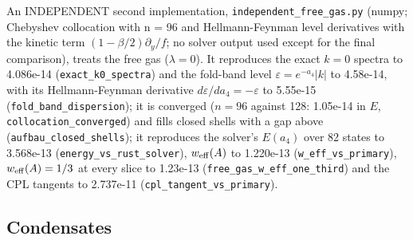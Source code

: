 \documentclass[11pt]{article}
\begin{document}
An INDEPENDENT second implementation, \texttt{independ\allowbreak{}ent\_free\allowbreak{}\_gas.py} (numpy; Chebyshev collocation with n = 96 and Hellmann-Feynman level derivatives with the kinetic term $(1 - \beta/2)\partial_y/f$; no solver output used except for the final comparison), treats the free gas ($\lambda = 0$). It reproduces the exact $k = 0$ spectra to 4.086e-14 (\texttt{exact\_k0\allowbreak{}\_spectra}) and the fold-band level $\varepsilon = e^{-a_4}\lvert k\rvert$ to 4.58e-14, with its Hellmann-Feynman derivative $d\varepsilon/da_4 = -\varepsilon$ to 5.55e-15 (\texttt{fold\_ban\allowbreak{}d\_disper\allowbreak{}sion}); it is converged ($n = 96$ against 128: 1.05e-14 in $E$, \texttt{collocat\allowbreak{}ion\_conv\allowbreak{}erged}) and fills closed shells with a gap above (\texttt{aufbau\_c\allowbreak{}losed\_sh\allowbreak{}ells}); it reproduces the solver's $E(a_4)$ over 82 states to 3.568e-13 (\texttt{energy\_v\allowbreak{}s\_rust\_s\allowbreak{}olver}), $w_{\rm eff}(A)$ to 1.220e-13 (\texttt{w\_eff\_vs\allowbreak{}\_primary}), $w_{\rm eff}(A) = 1/3$ at every slice to 1.23e-13 (\texttt{free\_gas\allowbreak{}\_w\_eff\_o\allowbreak{}ne\_third}) and the CPL tangents to 2.737e-11 (\texttt{cpl\_tang\allowbreak{}ent\_vs\_p\allowbreak{}rimary}).

\subsection{Condensates}
\end{document}
